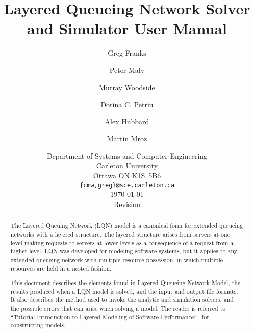 \documentclass{report}
\begin{document}
\title{Layered Queueing Network Solver and Simulator User Manual}
\author{Greg Franks \and Peter Maly \and Murray Woodside \and Dorina
  C. Petriu \and Alex Hubbard \and Martin Mroz}
\date{Department of Systems and Computer Engineering\\
  Carleton University\\
  Ottawa ON K1S~5B6\\
  \texttt{\{cmw,greg\}@sce.carleton.ca}\\[1cm]
  \today\\[1cm]
  $\ $Revision$\ $ } \maketitle \clearpage
\tableofcontents
\listoffigures
\listoftables
\clearpage
\begin{abstract}
  
The Layered Queuing Network (LQN) model is a canonical form for extended
queueing networks with a layered structure.
The layered structure arises from servers at one level making requests to servers at lower levels as a
consequence of a request from a higher level. LQN was developed for modeling software systems, but it
applies to any extended queueing network with multiple resource possession, in
which multiple resources are held in a nested fashion.

This document describes the elements found in Layered Queueing Network Model, the results produced when a
LQN model is solved, and the input and output file formats.  It also describes the method used to invoke the
analytic and simulation solvers, and the possible errors that can arise when solving a model.  The reader is
referred to ``Tutorial Introduction to Layered Modeling of Software Performance''~\cite{sw:woodside-xx} for
constructing models.
\end{abstract}










\appendix

\clearpage


%
\clearpage
\printindex
\end{document}
